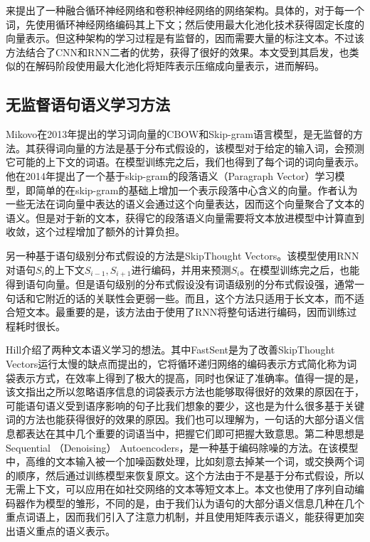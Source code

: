 \documentclass[UTF8,11pt,a4paper,nofonts]{ctexart}
\begin{document}
来\cite{lai2015recurrent}提出了一种融合循环神经网络和卷积神经网络的网络架构。具体的，对于每一个词，先使用循环神经网络编码其上下文；然后使用最大化池化技术获得固定长度的向量表示。但这种架构的学习过程是有监督的，因而需要大量的标注文本。不过该方法结合了CNN和RNN二者的优势，获得了很好的效果。本文受到其启发，也类似的在解码阶段使用最大化池化将矩阵表示压缩成向量表示，进而解码。


\subsection{无监督语句语义学习方法}
Mikovo在2013年提出的学习词向量的CBOW和Skip-gram语言模型\cite{mikolov2013efficient}，是无监督的方法。其获得词向量的方法是基于分布式假设的，该模型对于给定的输入词，会预测它可能的上下文的词语。在模型训练完之后，我们也得到了每个词的词向量表示。他在2014年提出了一个基于skip-gram的段落语义（Paragraph Vector）学习模型，即简单的在skip-gram的基础上增加一个表示段落中心含义的向量。作者认为一些无法在词向量中表达的语义会通过这个向量表达，因而这个向量聚合了文本的语义。但是对于新的文本，获得它的段落语义向量需要将文本放进模型中计算直到收敛，这个过程增加了额外的计算负担。

另一种基于语句级别分布式假设的方法是SkipThought Vectors\cite{kiros2015skip}。该模型使用RNN对语句$S_i$的上下文$S_{i-1}, S_{i+1}$进行编码，并用来预测$S_i$。在模型训练完之后，也能得到语句向量。但是语句级别的分布式假设没有词语级别的分布式假设强，通常一句话和它附近的话的关联性会更弱一些。而且，这个方法只适用于长文本，而不适合短文本。最重要的是，该方法由于使用了RNN将整句话进行编码，因而训练过程耗时很长。

Hill\cite{hill2016learning}介绍了两种文本语义学习的想法。其中FastSent是为了改善SkipThought Vectors运行太慢的缺点而提出的，它将循环递归网络的编码表示方式简化称为词袋表示方式，在效率上得到了极大的提高，同时也保证了准确率。值得一提的是，该文指出之所以忽略语序信息的词袋表示方法也能够取得很好的效果的原因在于，可能语句语义受到语序影响的句子比我们想象的要少，这也是为什么很多基于关键词的方法也能获得很好的效果的原因。我们也可以理解为，一句话的大部分语义信息都表达在其中几个重要的词语当中，把握它们即可把握大致意思。第二种思想是Sequential （Denoising） Autoencoders，是一种基于编码除噪的方法。在该模型中，高维的文本输入被一个加噪函数处理，比如刻意去掉某一个词，或交换两个词的顺序，然后通过训练模型来恢复原文。这个方法由于不是基于分布式假设，所以无需上下文，可以应用在如社交网络的文本等短文本上。本文也使用了序列自动编码器作为模型的雏形，不同的是，由于我们认为语句的大部分语义信息几种在几个重点词语上，因而我们引入了注意力机制，并且使用矩阵表示语义，能获得更加突出语义重点的语义表示。
\end{document}
